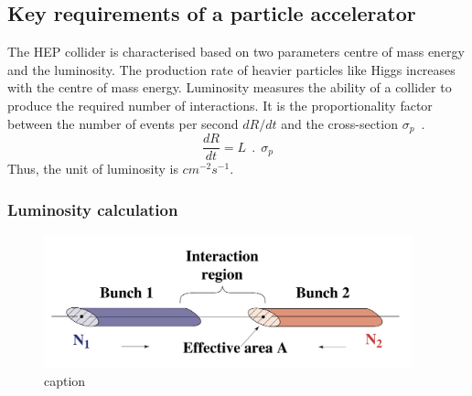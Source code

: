 \subsection{Key requirements of a particle accelerator} %
\label{sub:few_key_requirements}

The HEP collider is characterised based on two parameters centre of mass energy and the luminosity. The production rate of heavier particles like Higgs increases with the centre of mass energy. Luminosity measures the ability of a collider to produce the required number of interactions. It is the proportionality factor between the number of events per second $dR/dt$ and the cross-section $\sigma_p$~\cite{Muratori2006}.
\begin{equation}
	\frac{dR}{dt} = L ~~.~~ \sigma_p
\end{equation}
Thus, the unit of luminosity is $cm^{-2}s^{-1}$.

\subsubsection{Luminosity calculation} %
\label{ssub:luminosity_calculation}


\begin{figure}[!htbp]
	\centering
	\includegraphics[width=0.95\textwidth]{figures/LHC/Luminosity_calculation.jpg}
	\caption{caption}
	\label{fig:label}
\end{figure}


